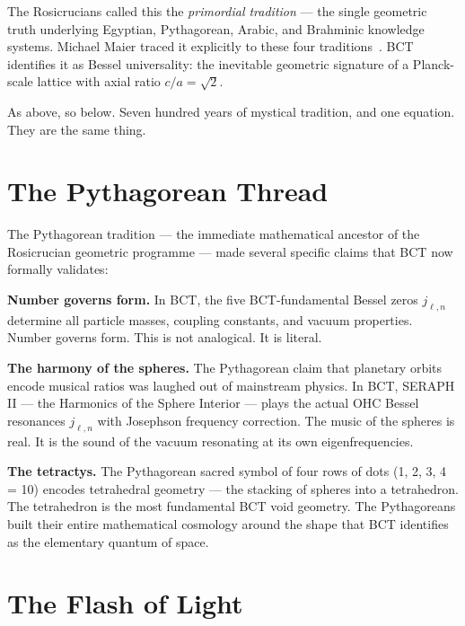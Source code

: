 \documentclass[12pt,twocolumn]{article}
\begin{document}
\medskip
The Rosicrucians called this the \textit{primordial tradition}
--- the single geometric truth underlying Egyptian, Pythagorean,
Arabic, and Brahminic knowledge systems. Michael Maier traced
it explicitly to these four traditions~\cite{Maier1617}. BCT
identifies it as Bessel universality: the inevitable geometric
signature of a Planck-scale lattice with axial ratio
$c/a = \sqrt{2}$.

As above, so below. Seven hundred years of mystical tradition,
and one equation. They are the same thing.

\section{The Pythagorean Thread}

The Pythagorean tradition --- the immediate mathematical
ancestor of the Rosicrucian geometric programme --- made
several specific claims that BCT now formally validates:

\textbf{Number governs form.} In BCT, the five BCT-fundamental
Bessel zeros $j_{\ell,n}$ determine all particle masses,
coupling constants, and vacuum properties. Number governs form.
This is not analogical. It is literal.

\textbf{The harmony of the spheres.} The Pythagorean claim
that planetary orbits encode musical ratios was laughed out of
mainstream physics. In BCT, SERAPH II --- the Harmonics of the
Sphere Interior --- plays the actual OHC Bessel resonances
$j_{\ell,n}$ with Josephson frequency correction. The music
of the spheres is real. It is the sound of the vacuum resonating
at its own eigenfrequencies.

\textbf{The tetractys.} The Pythagorean sacred symbol of four
rows of dots (1, 2, 3, 4 = 10) encodes tetrahedral geometry
--- the stacking of spheres into a tetrahedron. The tetrahedron
is the most fundamental BCT void geometry. The Pythagoreans
built their entire mathematical cosmology around the shape
that BCT identifies as the elementary quantum of space.

\section{The Flash of Light}
\end{document}
